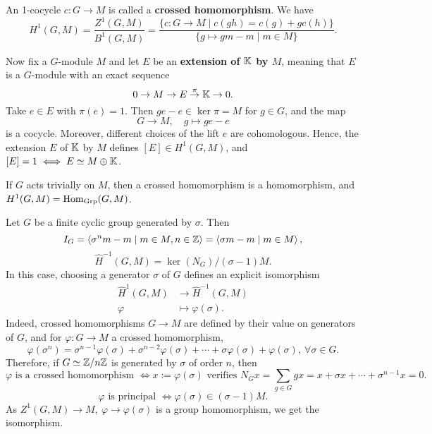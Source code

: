 \begin{example}[$H^1$]
    An 1-cocycle $c : G\to M$ is called a \textbf{crossed homomorphism}.
    We have \[
        H^1(G, M) = \frac{Z^1(G, M )}{B^1(G, M )}
        = \frac{\{c  :G\to M\mid c(gh) = c(g) + gc(h)\}}{\{g\mapsto gm - m\mid m\in M \}}.\]

    Now fix a $G$-module $M$ and let $E$ be an \textbf{extension of $\mathbb{K}$ by $M$},
    meaning that $E$ is a $G$-module with an exact sequence\[0\to M\to E\stackrel{\pi}{\to} \mathbb{K}\to 0.\]
    Take $e\in E$ with $\pi(e) = 1$.
    Then $ge - e\in\ker\pi = M$ for $g\in G$,
    and the map \[G\to M,\quad g\mapsto ge - e\]
    is a cocycle. Moreover, different choices of the lift $e$ are cohomologous.
    Hence, the extension $E$ of $\mathbb{K}$ by $M$ defines $[E]\in H^1(G, M)$,
    and $[E] = 1\iff E\simeq M\oplus \mathbb{K}$.
\end{example}

\begin{example}
    If $G$ acts trivially on $M$,
    then a crossed homomorphism is a homomorphism,
    and $H^1(G, M) = \operatorname{Hom}_{\text{Grp}}(G, M)$.
\end{example}

\begin{example}\label{eg: H1 to H-1 for finite cyclic group}
    Let $G$ be a finite cyclic group generated by $\sigma$.
    Then \[I_G = \left\langle \sigma^n m - m\mid m\in M, n\in\mathbb{Z}  \right\rangle = \left\langle \sigma m - m\mid m\in M \right\rangle,\]
    \[\hat H^{-1}(G, M) = \ker(N_G)/(\sigma - 1)M.\]
    In this case, choosing a generator $\sigma$ of $G$ defines an explicit isomorphism
    \begin{align*}
        \hat H^1(G, M) &\to \hat H^{-1}(G, M)\\
        \varphi&\mapsto \varphi(\sigma).
    \end{align*}
    Indeed, crossed homomorphisms $G\to M$ are defined by their value on generators of $G$, and for $\varphi : G\to M$ a crossed homomorphism, \[
    \varphi(\sigma^n) = \sigma^{n-1}\varphi(\sigma) + \sigma^{n-2}\varphi(\sigma) + \cdots + \sigma\varphi(\sigma) + \varphi(\sigma),\ \forall \sigma\in G.\]
    Therefore, if $G\simeq \mathbb{Z}/n\mathbb{Z}$ is generated by $\sigma$ of order $n$,
    then \[\varphi\text{ is a crossed homomorphism }\iff x := \varphi(\sigma) \text{ verifies } N_Gx = \sum_{g\in G} gx = x + \sigma x + \cdots + \sigma^{n-1}x =0.\]
    \[\varphi \text{ is principal }\iff \varphi(\sigma) \in \left( \sigma - 1 \right)M.\]
    As $Z^1(G, M)\to M,\ \varphi\to \varphi(\sigma)$ is a group homomorphism, we get the isomorphism.
\end{example}

